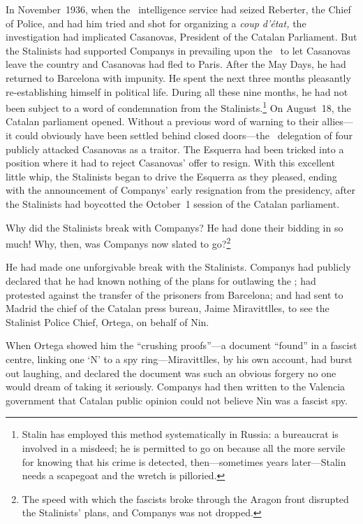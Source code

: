 In November~1936, when the \CNT\ intelligence service had seized Reberter, the Chief of Police, and had him tried and shot for organizing a \emph{coup d’\'etat,} the investigation had implicated Casanovas, President of the Catalan Parliament. But the Stalinists had supported Companys in prevailing upon the \CNT\ to let Casanovas leave the country and Casanovas had fled to Paris. After the May Days, he had returned to Barcelona with impunity. He spent the next three months pleasantly re-establishing himself in political life. During all these nine months, he had not been subject to a word of condemnation from the Stalinists.\footnote{Stalin has employed this method systematically in Russia: a bureaucrat is involved in a misdeed; he is permitted to go on because all the more servile for knowing that his crime is detected, then---sometimes years later---Stalin needs a scapegoat and the wretch is pilloried.} On August~18, the Catalan parliament opened. Without a previous word of warning to their allies---it could obviously have been settled behind closed doors---the \PSUC\ delegation of four publicly attacked Casanovas as a traitor. The Esquerra had been tricked into a position where it had to reject Casanovas’ offer to resign. With this excellent little whip, the Stalinists began to drive the Esquerra as they pleased, ending with the announcement of Companys’ early resignation from the presidency, after the Stalinists had boycotted the October~1 session of the Catalan parliament.

Why did the Stalinists break with Companys? He had done their bidding in so much! Why, then, was Companys now slated to go?\footnote{The speed with which the fascists broke through the Aragon front disrupted the Stalinists’ plans, and Companys was not dropped.}

He had made one unforgivable break with the Stalinists. Companys had publicly declared that he had known nothing of the plans for outlawing the \POUM; had protested against the transfer of the prisoners from Barcelona; and had sent to Madrid the chief of the Catalan press bureau, Jaime Miravittlles, to see the Stalinist Police Chief, Ortega, on behalf of Nin.

When Ortega showed him the ``crushing proofs''---a document ``found'' in a fascist centre, linking one ‘N’ to a spy ring---Miravittlles, by his own account, had burst out laughing, and declared the document was such an obvious forgery no one would dream of taking it seriously. Companys had then written to the Valencia government that Catalan public opinion could not believe Nin was a fascist spy.

